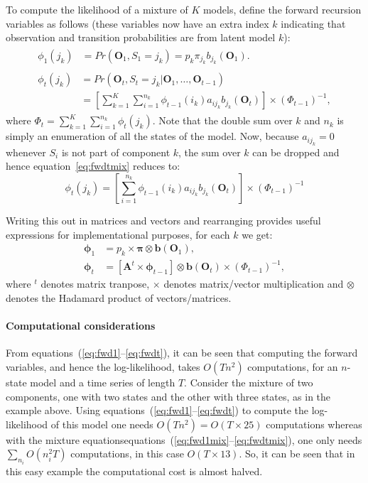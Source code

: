 \documentclass[a4paper,man,nobf]{apa}
\newcommand{\vc}{\mathbf}
\newcommand{\mat}{\mathbf}
\begin{document}
To compute the likelihood of a mixture of $K$ models, define the 
forward recursion variables as follows (these variables now have an 
extra index $k$ indicating that observation and transition 
probabilities are from latent model $k$):
\begin{align}
\begin{split}
\phi_{1}(j_{k}) &=  Pr(\vc{O}_{1}, 
S_{1}=j_{k})=p_{k}\pi_{j_{k}}b_{j_{k}}(\vc{O}_{1}).
\end{split}\label{eq:fwd1mix} \\
\begin{split}
\phi_{t}(j_{k})   &=   Pr(\vc{O}_{t}, S_{t}=j_{k}|\vc{O}_{1}, \ldots, 
\vc{O}_{t-1}) \\
			&= \left[ \sum_{k=1}^{K} \sum_{i=1}^{n_{k}} \phi_{t-1}(i_{k}) 
			a_{ij_{k}}b_{j_{k}}(\vc{O}_{t}) \right] \times (\Phi_{t-1})^{-1},
\end{split}\label{eq:fwdtmix} 
\end{align}
where $\Phi_{t} =  \sum_{k=1}^{K}\sum_{i=1}^{n_{k}} 
\phi_{t}(j_{k})$.  Note that the double sum over $k$ and $n_{k}$ is 
simply an enumeration of all the states of the model. Now, because 
$a_{ij_{k}}=0$ whenever $S_{i}$ is not part of component $k$, the sum 
over $k$ can be dropped and hence equation~\ref{eq:fwdtmix} reduces 
to:
\begin{equation}
	\phi_{t}(j_{k}) = \left[ \sum_{i=1}^{n_{k}} \phi_{t-1}(i_{k}) 
			a_{ij_{k}}b_{j_{k}}(\vc{O}_{t}) \right] \times (\Phi_{t-1})^{-1}
\end{equation}

Writing this out in matrices and vectors and rearranging provides 
useful expressions for implementational  purposes, for each $k$ we 
get:
\begin{align}
	\vc{\phi}_{1} &=  p_{k} \times \pmb{\pi} \otimes 
\vc{b}(\vc{O}_{1}),\\
	\vc{\phi}_{t} &= \left[ \mat{A}^{t} \times \pmb{\phi}_{t-1} \right ] 
		\otimes \vc{b} (\vc{O}_{t}) \times (\Phi_{t-1})^{-1},
\end{align}
where $^{t}$ denotes matrix tranpose, $\times$ denotes matrix/vector 
multiplication and $\otimes$ denotes the Hadamard product of 
vectors/matrices. 

\paragraph{Computational considerations} From 
equations~(\ref{eq:fwd1}--\ref{eq:fwdt}), it can be seen that 
computing the forward variables, and hence the log-likelihood, takes 
$O(Tn^{2})$ computations, for an $n$-state model and a time series of 
length $T$. Consider the mixture of two components, one with two 
states and the other with three states, as in the example above. 
Using equations~(\ref{eq:fwd1}--\ref{eq:fwdt}) to compute the 
log-likelihood of this model one needs $O(Tn^{2})=O(T\times 25)$ 
computations whereas with the mixture 
equationsequations~(\ref{eq:fwd1mix}--\ref{eq:fwdtmix}), one only 
needs $\sum_{n_{i}} O(n_{i}^{2}T)$ computations, in this case $O(T 
\times 13)$. So, it can  be seen that in this easy example the 
computational cost is almost halved.  
\end{document}
